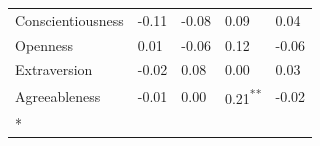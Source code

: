 \documentclass[
  letterpaper,
  DIV=11,
  numbers=noendperiod]{scrartcl}
\begin{document}
\begin{longtable}[t]{l>{\raggedright\arraybackslash}p{4.5em}>{\raggedright\arraybackslash}p{4.5em}>{\raggedright\arraybackslash}p{4.5em}>{\raggedright\arraybackslash}p{4.5em}}
\hspace{1em}Conscientiousness & \textcolor[HTML]{808080}{-0.11} & \textcolor[HTML]{808080}{-0.08} & \textcolor[HTML]{808080}{0.09} & \textcolor[HTML]{808080}{0.04}\\
\hspace{1em}Openness & \textcolor[HTML]{808080}{0.01} & \textcolor[HTML]{808080}{-0.06} & \textcolor[HTML]{808080}{0.12} & \textcolor[HTML]{808080}{-0.06}\\
\hspace{1em}Extraversion & \textcolor[HTML]{808080}{-0.02} & \textcolor[HTML]{808080}{0.08} & \textcolor[HTML]{808080}{0.00} & \textcolor[HTML]{808080}{0.03}\\
\hspace{1em}Agreeableness & \textcolor[HTML]{808080}{-0.01} & \textcolor[HTML]{808080}{0.00} & \textcolor[HTML]{D46780}{0.21\textsuperscript{**}} & \textcolor[HTML]{808080}{-0.02}\\*

\end{longtable}
\end{document}
